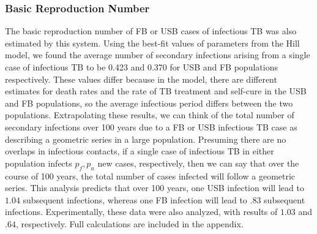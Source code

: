 \documentclass{amsart}
\begin{document}
\subsubsection{Basic Reproduction Number}
The basic reproduction number of FB or USB cases of infectious TB was also
estimated by this system. Using the best-fit values of parameters from the 
Hill model, we found the average number of secondary infections arising from
a single case of infectious TB to be 0.423 and 0.370 for USB and FB populations
respectively.  These values differ because in the model, there are different
estimates for death rates and the rate of TB treatment and self-cure in the USB and FB populations, 
so the average infectious period differs between the two populations.
Extrapolating these results, we can think of the
total number of secondary infections over 100 years due to a FB or USB
infectious TB case as describing a geometric series in a large population.
Presuming there are no overlaps in infectious contacts, if a single case of
infectious TB in either population infects $p_f, p_u$ new cases,
respectively, then we can say that over the course of 100 years, the total
number of cases infected will follow a geometric series. This analysis predicts
that over 100 years, one USB infection will lead to $1.04$ subsequent infections,
whereas one FB infection will lead to $.83$ subsequent infections. Experimentally, 
these data were also analyzed, with results of $1.03$ and $.64$, respectively. 
Full calculations are included in the appendix.  
\end{document}
